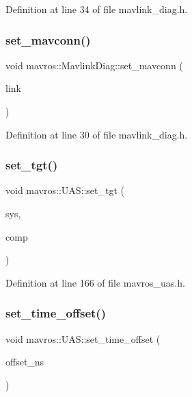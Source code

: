 Definition at line 34 of file mavlink\+\_\+diag.\+h.

\mbox{\label{group__nodelib_gaac672d37b57dc4d73ec73de04ea436ed}} 
\subsubsection{\texorpdfstring{set\_mavconn()}{set\_mavconn()}}
{\footnotesize\ttfamily void mavros\+::\+Mavlink\+Diag\+::set\+\_\+mavconn (\begin{DoxyParamCaption}\item[{const \mbox{\hyperlink{group__mavconn_gaff41078b805e1d8f85ed6fd2d87711ce}{mavconn\+::\+M\+A\+V\+Conn\+Interface\+::\+Ptr}} \&}]{link }\end{DoxyParamCaption})\hspace{0.3cm}{\ttfamily [inline]}}



Definition at line 30 of file mavlink\+\_\+diag.\+h.

\mbox{\label{group__nodelib_ga87eb84159321497e07dc4c739bdb727d}} 
\subsubsection{\texorpdfstring{set\_tgt()}{set\_tgt()}}
{\footnotesize\ttfamily void mavros\+::\+U\+A\+S\+::set\+\_\+tgt (\begin{DoxyParamCaption}\item[{uint8\+\_\+t}]{sys,  }\item[{uint8\+\_\+t}]{comp }\end{DoxyParamCaption})\hspace{0.3cm}{\ttfamily [inline]}}



Definition at line 166 of file mavros\+\_\+uas.\+h.

\mbox{\label{group__nodelib_ga50b971d58f9196c4201a1a3213428e71}} 
\subsubsection{\texorpdfstring{set\_time\_offset()}{set\_time\_offset()}}
{\footnotesize\ttfamily void mavros\+::\+U\+A\+S\+::set\+\_\+time\+\_\+offset (\begin{DoxyParamCaption}\item[{uint64\+\_\+t}]{offset\+\_\+ns }\end{DoxyParamCaption})\hspace{0.3cm}{\ttfamily [inline]}}



